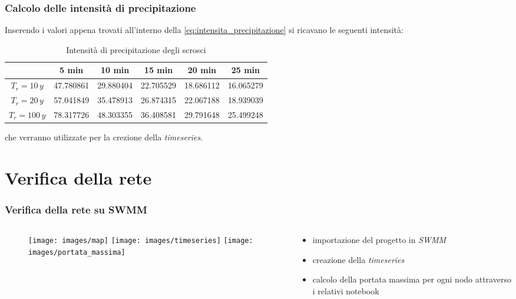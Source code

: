 \documentclass{beamer}
\begin{document}
\begin{frame}
 \frametitle{Calcolo delle intensità di precipitazione}
 Inserendo i valori appena trovati all'interno della \eqref{eq:intensita_precipitazione} si ricavano le seguenti intensità:
  \small
    \begin{table}
    \caption{Intensità di precipitazione degli scrosci}
    \begin{tabular}{cccccc}
    \toprule
    &5 min &      10 min &      15 min &      20 min &      25 min \\ 
    \midrule
    $T_r = 10\,y$ &47.780861 &  29.880404 &  22.705529 &  18.686112 &  16.065279 \\
    $T_r = 20\,y$ &57.041849 &  35.478913 &  26.874315 &  22.067188 &  18.939039 \\
    $T_r = 100\,y$ &78.317726 &  48.303355 &  36.408581 &  29.791648 &  25.499248 \\
    \bottomrule
    \end{tabular}
    \end{table}
    che verranno utilizzate per la crezione della \emph{timeseries}.
\end{frame}

\section{Verifica della rete}
\begin{frame}
 \frametitle{Verifica della rete su SWMM}
 
 \begin{columns}
  \begin{column}{.5\textwidth}
  \begin{figure}
   \centering
   \begin{overprint}
     \texttt{[image: images/map]}
     \texttt{[image: images/timeseries]}
     \texttt{[image: images/portata\_massima]}
   \end{overprint}
  \end{figure}   
  \end{column}
  
  \begin{column}{.5\textwidth}
   \begin{itemize}
    \item importazione del progetto in \emph{SWMM}
    \item creazione della \emph{timeseries}
    \item calcolo della portata massima per ogni nodo attraverso i relativi notebook
  \end{itemize}
  \end{column}
 \end{columns}
\end{frame}
\end{document}
